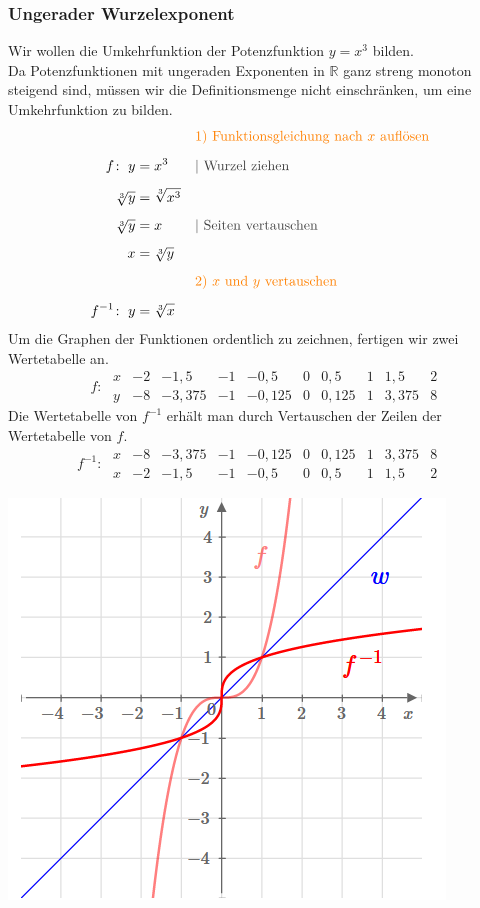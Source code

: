 \begin{multicols}{2}
    \subsubsection{Ungerader Wurzelexponent}
    \vspace{-4mm}
    Wir wollen die Umkehrfunktion der Potenzfunktion $y = x^3$ bilden. \\
    Da Potenzfunktionen mit ungeraden Exponenten in $\mathbb{R}$ ganz streng monoton steigend sind, müssen wir die Definitionsmenge nicht einschränken, um eine Umkehrfunktion zu bilden.
    \begin{align*} & &&{\color{orange}\text{1) Funktionsgleichung nach $x$ auflösen}} \\[5px] f\colon\; y &= x^3 &&{\color{darkgray}| \text{ Wurzel ziehen}} \\[5px] \sqrt[3]{y} &= \sqrt[3]{x^3} \\[5px] \sqrt[3]{y} &= x &&{\color{darkgray}| \text{ Seiten vertauschen}} \\[5px] x &= \sqrt[3]{y} \\[5px] & &&{\color{orange}\text{2) $x$ und $y$ vertauschen}} \\[5px] f^{-1}\colon\; y &= \sqrt[3]{x} \end{align*}
    Um die Graphen der Funktionen ordentlich zu zeichnen, fertigen wir zwei Wertetabelle an.
    \[\phantom{^{-1}}f\colon\; \begin{array}{r|c|c|c|c|c|c|c|c|c} x & -2 & -1{,}5 & -1 & -0{,}5 & 0 & 0{,}5 & 1 & 1{,}5 & 2 \\ \hline y & -8 & -3{,}375 & -1 & -0{,}125 & 0 & 0{,}125 & 1 & 3{,}375 & 8 \end{array}\]
    Die Wertetabelle von $f^{-1}$ erhält man durch Vertauschen der Zeilen der Wertetabelle von $f$.
    \[f^{-1}\colon\; \begin{array}{r|c|c|c|c|c|c|c|c|c} x & -8 & -3{,}375 & -1 & -0{,}125 & 0 & 0{,}125 & 1 & 3{,}375 & 8 \\ \hline x & -2 & -1{,}5 & -1 & -0{,}5 & 0 & 0{,}5 & 1 & 1{,}5 & 2 \end{array}\]
    \begin{center}
        \includegraphics[scale=0.7]{wurzelfunktion3}
    \end{center}


\end{multicols}
